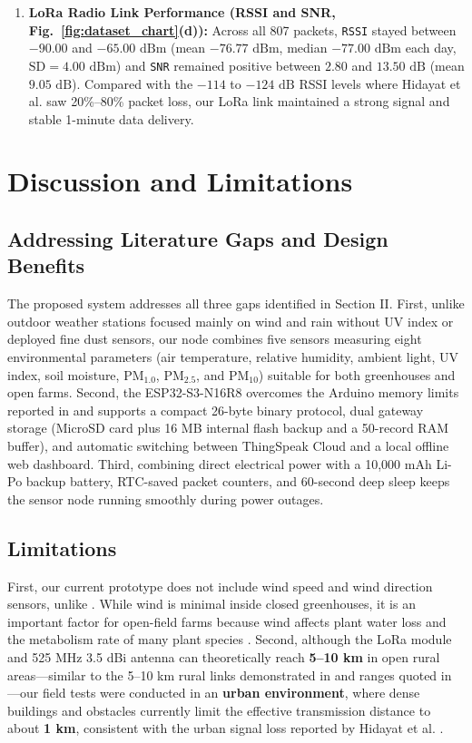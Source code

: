 \documentclass[conference,onecolumn]{IEEEtran}
\begin{document}
\begin{enumerate}
    \item \textbf{LoRa Radio Link Performance (RSSI and SNR, Fig.~\ref{fig:dataset_chart}(d)):} Across all 807 packets, \texttt{RSSI} stayed between $-90.00$ and $-65.00\text{ dBm}$ (mean $-76.77\text{ dBm}$, median $-77.00\text{ dBm}$ each day, $\text{SD} = 4.00\text{ dBm}$) and \texttt{SNR} remained positive between $2.80$ and $13.50\text{ dB}$ (mean $9.05\text{ dB}$). Compared with the $-114$ to $-124\text{ dB}$ RSSI levels where Hidayat et al. \cite{hidayat2019} saw 20\%--80\% packet loss, our LoRa link maintained a strong signal and stable 1-minute data delivery.
\end{enumerate}

\section{Discussion and Limitations}

\subsection{Addressing Literature Gaps and Design Benefits}
The proposed system addresses all three gaps identified in Section II. First, unlike outdoor weather stations focused mainly on wind and rain \cite{dajnowski2024, zennaro2025, lopez2025, pietrosemoli2019, murdyantoro2019} without UV index or deployed fine dust sensors, our node combines five sensors measuring eight environmental parameters (air temperature, relative humidity, ambient light, UV index, soil moisture, $\text{PM}_{1.0}$, $\text{PM}_{2.5}$, and $\text{PM}_{10}$) suitable for both greenhouses and open farms. Second, the ESP32-S3-N16R8 overcomes the Arduino memory limits reported in \cite{dajnowski2024} and supports a compact 26-byte binary protocol, dual gateway storage (MicroSD card plus 16 MB internal flash backup and a 50-record RAM buffer), and automatic switching between ThingSpeak Cloud and a local offline web dashboard. Third, combining direct electrical power with a 10,000 mAh Li-Po backup battery, RTC-saved packet counters, and 60-second deep sleep keeps the sensor node running smoothly during power outages.

\subsection{Limitations}
First, our current prototype does not include wind speed and wind direction sensors, unlike \cite{dajnowski2024, zennaro2025, lopez2025, pietrosemoli2019, murdyantoro2019}. While wind is minimal inside closed greenhouses, it is an important factor for open-field farms because wind affects plant water loss and the metabolism rate of many plant species \cite{dajnowski2024}. Second, although the LoRa module and 525 MHz 3.5 dBi antenna can theoretically reach \textbf{5--10 km} in open rural areas---similar to the 5--10 km rural links demonstrated in \cite{lopez2025} and ranges quoted in \cite{dajnowski2024, murdyantoro2019}---our field tests were conducted in an \textbf{urban environment}, where dense buildings and obstacles currently limit the effective transmission distance to about \textbf{1 km}, consistent with the urban signal loss reported by Hidayat et al. \cite{hidayat2019}.
\end{document}
